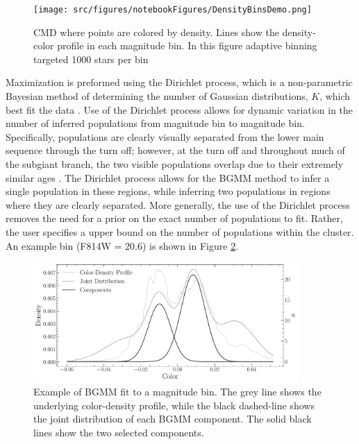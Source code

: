 \begin{figure}
	\centering
	\texttt{[image: src/figures/notebookFigures/DensityBinsDemo.png]}
	\label{fig:densityBinsDemo}
	\caption{CMD where points are colored by density. Lines show the
	density-color profile in each magnitude bin. In this figure adaptive
	binning targeted 1000 stars per bin}
\end{figure}

Maximization is preformed using the Dirichlet process, which is a
non-parametric Bayesian method of determining the number of Gaussian distributions, $K$,
which best fit the data \citep{Ferguson1973, scikit-learn}. Use of the Dirichlet process
allows for dynamic variation in the number of inferred populations from
magnitude bin to magnitude bin. Specifically, populations are clearly visually
separated from the lower main sequence through the turn off; however, at the
turn off and throughout much of the subgiant branch, the two visible
populations overlap due to their extremely similar ages \citep[i.e.][]{Jordan2002}. The Dirichlet process allows for the BGMM method to infer a single
population in these regions, while inferring two populations in regions where
they are clearly separated. More generally, the use of the Dirichlet process
removes the need for a prior on the exact number of populations to fit. Rather,
the user specifies a upper bound on the number of populations within the
cluster. An example bin (F814W = 20.6) is shown in Figure \ref{fig:BGMMDist}.

\begin{figure}
	\centering
	\includegraphics[width=0.9\textwidth]{Notebooks/Figures/BGMMMixingBin.pdf}
	\caption{Example of BGMM fit to a magnitude bin. The grey line shows the
	underlying color-density profile, while the black dashed-line shows the
	joint distribution of each BGMM component. The solid black lines show the
	two selected components.}
	\label{fig:BGMMDist}
\end{figure}

